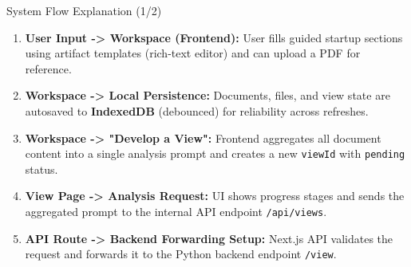 \documentclass{beamer}
\begin{document}
\begin{frame}{System Flow Explanation (1/2)}
\small
\begin{enumerate}
    \item \textbf{User Input -> Workspace (Frontend):}
    User fills guided startup sections using artifact templates (rich-text editor) and can upload a PDF for reference.

    \item \textbf{Workspace -> Local Persistence:}
    Documents, files, and view state are autosaved to \textbf{IndexedDB} (debounced) for reliability across refreshes.

    \item \textbf{Workspace -> "Develop a View":}
    Frontend aggregates all document content into a single analysis prompt and creates a new \texttt{viewId} with \texttt{pending} status.

    \item \textbf{View Page -> Analysis Request:}
    UI shows progress stages and sends the aggregated prompt to the internal API endpoint \texttt{/api/views}.

    \item \textbf{API Route -> Backend Forwarding Setup:}
    Next.js API validates the request and forwards it to the Python backend endpoint \texttt{/view}.
\end{enumerate}
\end{frame}
\end{document}
